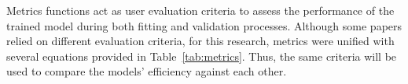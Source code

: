 %
Metrics functions act as user evaluation criteria to assess the performance of the trained model during both fitting and validation processes.
Although some papers relied on different evaluation criteria, for this research, metrics were unified with several equations provided in \mbox{Table~\ref{tab:metrics}}.
Thus, the same criteria will be used to compare the models' efficiency against each other.
\begin{table}[htbp]
    \renewcommand{\arraystretch}{1.3}
    \caption{Model's metrics functions}
    \centering
    \label{tab:metrics}
\end{table}

%
